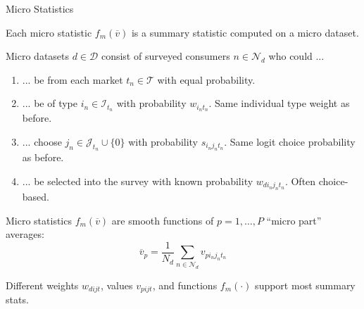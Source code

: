 \documentclass[aspectratio=169,t,11pt,table]{beamer}
\begin{document}
\begin{frame}{Micro Statistics}
    \begin{wideitemize}
        \item Each micro statistic $f_m(\overline{v})$ is a summary statistic computed on a micro dataset.
        \pause
        \item Micro datasets $d \in \mathcal{D}$ consist of surveyed consumers $n \in \mathcal{N}_d$ who could ...
        \pause
        \begin{enumerate}
            \item ... be from each market $t_n \in \mathcal{T}$ with equal probability.
            \pause
            \item ... be of type $i_n \in \mathcal{I}_{t_n}$ with probability $w_{i_nt_n}$. Same individual type weight as before.
            \pause
            \item ... choose $j_n \in \mathcal{J}_{t_n} \cup \{0\}$ with probability $s_{i_nj_nt_n}$. Same logit choice probability as before.
            \pause
            \item ... be selected into the survey with known probability $w_{di_nj_nt_n}$. Often \alert{choice-based}.
        \end{enumerate}
        \pause
        \item Micro statistics $f_m(\overline{v})$ are smooth functions of $p = 1, \dots, P$ ``micro part'' averages:
        \begin{equation*}
            \overline{v}_p = \frac{1}{N_d} \sum_{n \in \mathcal{N}_d} v_{pi_nj_nt_n}
        \end{equation*}
        \vspace{-\baselineskip}
        \pause
        \item Different weights $w_{dijt}$, values $v_{pijt}$, and functions $f_m(\cdot)$ support most summary stats. 
    \end{wideitemize}
\end{frame}
\end{document}
